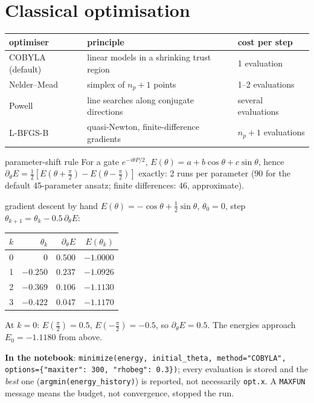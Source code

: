 \documentclass[11pt,a4paper,openany]{book}
\newcounter{wex}[chapter]
\begin{document}
\section{Classical optimisation}
\begin{center}\small
\begin{tabular}{lll}
\toprule optimiser & principle & cost per step\\ \midrule
COBYLA (default) & linear models in a shrinking trust region & 1 evaluation\\
Nelder--Mead & simplex of $n_p + 1$ points & 1--2 evaluations\\
Powell & line searches along conjugate directions & several evaluations\\
L-BFGS-B & quasi-Newton, finite-difference gradients & $n_p + 1$ evaluations\\ \bottomrule
\end{tabular}
\end{center}
\begin{keyres}{parameter-shift rule}
For a gate $e^{-i\theta P/2}$, $E(\theta) = a + b\cos\theta + c\sin\theta$, hence $\partial_\theta E = \tfrac12[E(\theta + \tfrac\pi2) - E(\theta - \tfrac\pi2)]$ exactly: 2 runs per parameter
($90$ for the default 45-parameter ansatz; finite differences: $46$, approximate).
\end{keyres}
\begin{wexample}{gradient descent by hand}
$E(\theta) = -\cos\theta + \tfrac12\sin\theta$, $\theta_0 = 0$, step $\theta_{k+1} = \theta_k - 0.5\,\partial_\theta E$:
\begin{center}\small
\begin{tabular}{crrr}
\toprule $k$ & $\theta_k$ & $\partial_\theta E$ & $E(\theta_k)$\\ \midrule
0 & $0$ & $0.500$ & $-1.0000$\\ 1 & $-0.250$ & $0.237$ & $-1.0926$\\ 2 & $-0.369$ & $0.106$ & $-1.1130$\\ 3 & $-0.422$ & $0.047$ & $-1.1170$\\ \bottomrule
\end{tabular}
\end{center}
At $k = 0$: $E(\frac\pi2) = 0.5$, $E(-\frac\pi2) = -0.5$, so $\partial_\theta E = 0.5$. The energies approach $E_0 = -1.1180$ from above.
\end{wexample}
\begin{sloppypar}
\textbf{In the notebook}: \texttt{minimize(energy, initial\_theta, method="COBYLA", options=\{"maxiter": 300, "rhobeg": 0.3\})}; every evaluation is stored and the
\emph{best} one (\texttt{argmin(energy\_history)}) is reported, not necessarily \texttt{opt.x}. A \texttt{MAXFUN} message means the budget, not convergence, stopped the run.
\end{sloppypar}
\end{document}
